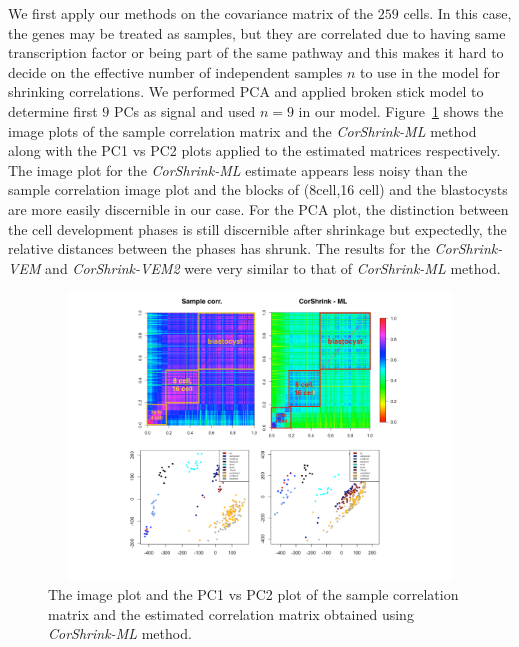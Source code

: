 We first apply our methods on the covariance matrix of the $259$ cells. In this case, the genes may be treated as  samples, but they are correlated due to having same transcription factor or being part of the same pathway and this makes it hard to decide on the effective number of independent samples $n$ to use in the model for shrinking correlations. We performed PCA and applied broken stick model to determine first $9$ PCs as signal and used $n=9$ in our model. Figure~\ref{fig:fig3}  shows the image plots of the sample correlation matrix and the \textit{CorShrink-ML} method along with the PC1 vs PC2 plots applied to the estimated matrices respectively. The image plot for the \textit{CorShrink-ML} estimate appears less noisy than the sample correlation image plot and the blocks of (8cell,16 cell) and the blastocysts are more easily discernible in our case. For the PCA plot, the distinction between the cell development phases is still discernible after shrinkage but expectedly, the relative distances between the phases has shrunk. The results for the \textit{CorShrink-VEM} and \textit{CorShrink-VEM2} were very similar to that of \textit{CorShrink-ML} method.

\begin{figure}[ht]
\raggedleft
\includegraphics[height=3in, width=6in]{../figures/paper_figures/figure3.pdf}
 \caption{\small{The image plot and the PC1 vs PC2 plot of the sample correlation matrix and the estimated correlation matrix obtained using \textit{CorShrink-ML} method.}}
\label{fig:fig3}
\end{figure}


